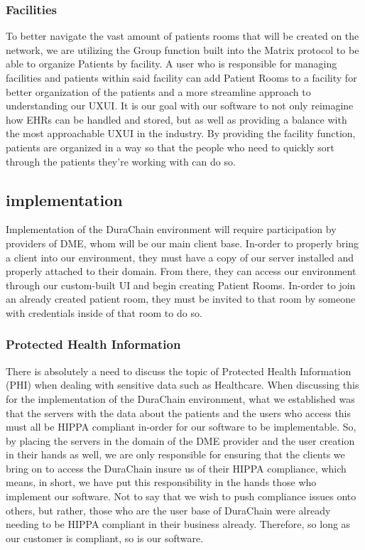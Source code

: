 \documentclass[letterpaper]{article}
\begin{document}
\subsubsection{Facilities}
To better navigate the vast amount of patients rooms that will be created on the network, we are utilizing the Group function built into the Matrix protocol to be able to organize Patients by facility. A user who is responsible for managing facilities and patients within said facility can add Patient Rooms to a facility for better organization of the patients and a more streamline approach to understanding our UXUI. It is our goal with our software to not only reimagine how EHRs can be handled and stored, but as well as providing a balance with the most approachable UXUI in the industry. By providing the facility function, patients are organized in a way so that the people who need to quickly sort through the patients they’re working with can do so.
%
\subsection{implementation}
Implementation of the DuraChain environment will require participation by providers of DME, whom will be our main client base. In-order to properly bring a client into our environment, they must have a copy of our server installed and properly attached to their domain. From there, they can access our environment through our custom-built UI and begin creating Patient Rooms. In-order to join an already created patient room, they must be invited to that room by someone with credentials inside of that room to do so.
%
\subsubsection{Protected Health Information}
There is absolutely a need to discuss the topic of Protected Health Information (PHI) when dealing with sensitive data such as Healthcare. When discussing this for the implementation of the DuraChain environment, what we established was that the servers with the data about the patients and the users who access this must all be HIPPA compliant in-order for our software to be implementable. So, by placing the servers in the domain of the DME provider and the user creation in their hands as well, we are only responsible for ensuring that the clients we bring on to access the DuraChain insure us of their HIPPA compliance, which means, in short, we have put this responsibility in the hands those who implement our software. Not to say that we wish to push compliance issues onto others, but rather, those who are the user base of DuraChain were already needing to be HIPPA compliant in their business already. Therefore, so long as our customer is compliant, so is our software.
%
\end{document}
